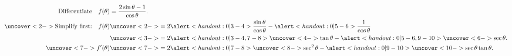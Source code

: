 \begin{frame}
\begin{example}
\begin{align*}
\text{Differentiate} \quad f(\theta) & = \frac{2\sin \theta - 1}{\cos \theta}. \\
\uncover<2->{%
\text{Simplify first:}\quad f(\theta) 
}%
& \uncover<2->{%
= 2\alert<handout:0| 3-4>{\frac{\sin \theta}{\cos\theta}} - \alert<handout:0| 5-6>{\frac{1}{\cos\theta}} %
}\\%
& \uncover<3->{%
= 2\alert<handout:0| 3-4,7-8>{\uncover<4->{\tan \theta}} - \alert<handout:0| 5-6,9-10>{\uncover<6->{\sec \theta}}. %
}\\%
\uncover<7->{%
f'(\theta) 
}%
& \uncover<7->{%
= 2\alert<handout:0| 7-8>{\uncover<8->{\sec^2\theta}} - \alert<handout:0| 9-10>{\uncover<10->{\sec \theta\tan\theta}}. %
}%
\end{align*}
\end{example}
\end{frame}
